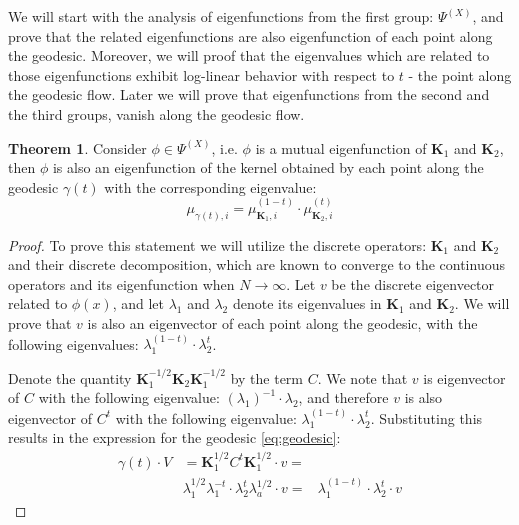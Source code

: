 \documentclass[]{article}
\theoremstyle{definition}
\newtheorem{theorem}{Theorem}
\begin{document}
	We will start with the analysis of eigenfunctions from the first group: $\Psi^{(X)}$, and prove that the related eigenfunctions are also eigenfunction of each point along the geodesic. Moreover, we will proof that the eigenvalues which are related to those eigenfunctions exhibit log-linear behavior with respect to $t$ - the point along the geodesic flow.
	Later we will prove that eigenfunctions from the second and the third groups, vanish along the geodesic flow.
	
	\begin{theorem}
		Consider $\phi \in \Psi^{(X)}$, i.e. $\phi$ is a mutual eigenfunction of $\mathbf{K}_1$ and $\mathbf{K}_2$, then $\phi$ is also an eigenfunction of the kernel obtained by each point along the geodesic $\gamma(t)$ with the corresponding eigenvalue:
		\begin{equation}
		\mu_{\gamma(t),i} = \mu_{\mathbf{K}_1,i}^{(1-t)} \cdot \mu_{\mathbf{K}_2,i}^{(t)} 
		\label{eq:CommonEigenVals}
		\end{equation}
	\end{theorem}
	
	\begin{proof}
		To prove this statement we will utilize the discrete operators: $\mathbf{K}_1$ and $\mathbf{K}_2$ and their discrete decomposition, which are known to converge to the continuous operators and its eigenfunction when $N \rightarrow \infty $. 
		Let $v$ be the discrete eigenvector related to $\phi(x)$, and let $\lambda_1$ and  $\lambda_2$ denote its eigenvalues in $\mathbf{K}_1$ and $\mathbf{K}_2$. We will prove that $v$ is also an eigenvector of each point along the geodesic, with the following eigenvalues:  $\lambda_1^{(1-t)}\cdot \lambda_2^t$.
		
		Denote the quantity $\mathbf{K}_1^{-1/2}\mathbf{K}_2\mathbf{K}_1^{-1/2}$ by the term $C$. We note that $v$ is eigenvector of $C$ with the following eigenvalue: $(\lambda_1)^{-1}\cdot\lambda_2$, and therefore $v$ is also eigenvector of $C^t$ with the following eigenvalue: $\lambda_1^{(1-t)} \cdot \lambda_2^{t}$.
		Substituting this results in the expression for the geodesic \ref{eq:geodesic}:
		\begin{equation}
		\begin{aligned}
			\gamma(t) \cdot V &= \mathbf{K}_1^{1/2}C^t\mathbf{K}_1^{1/2} \cdot v =\\
			&	\lambda_1^{1/2}\lambda_1^{-t}\cdot\lambda_2^t \lambda_a^{1/2}\cdot v= 
			& \lambda_1^{(1-t)} \cdot \lambda_2^{t}\cdot v
		\end{aligned}
		\end{equation}
	\end{proof}
\end{document}
